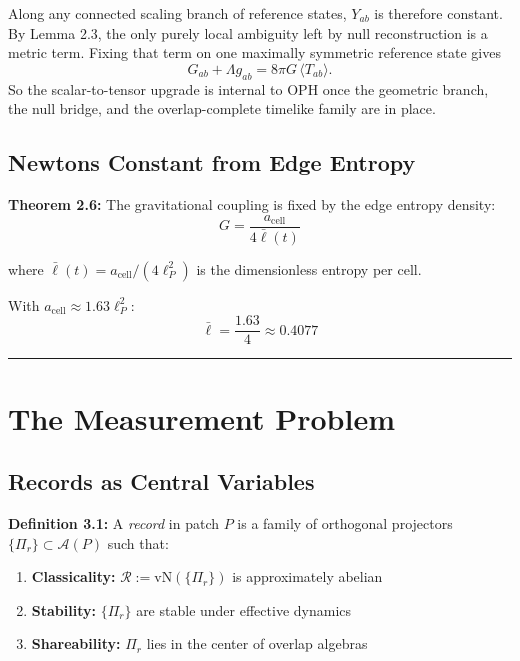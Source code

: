 Along any connected scaling branch of reference states, \(Y_{ab}\) is therefore constant. By Lemma 2.3, the only purely local ambiguity left by null reconstruction is a metric term. Fixing that term on one maximally symmetric reference state gives
\[
G_{ab}+\Lambda g_{ab}=8\pi G\,\langle T_{ab}\rangle.
\]
So the scalar-to-tensor upgrade is internal to OPH once the geometric branch, the null bridge, and the overlap-complete timelike family are in place.

\subsection{Newton\textquotesingle s Constant from Edge Entropy}\label{26-newtons-constant-from-edge-entropy}

\textbf{Theorem 2.6:} The gravitational coupling is fixed by the edge entropy density: \[G = \frac{a_{\text{cell}}}{4\bar{\ell}(t)}\]

where \(\bar{\ell}(t) = a_{\text{cell}}/(4\ell_P^2)\) is the dimensionless entropy per cell.

With \(a_{\text{cell}} \approx 1.63 \ell_P^2\): \[\bar{\ell} = \frac{1.63}{4} \approx 0.4077\]

\begin{center}\rule{0.5\linewidth}{0.5pt}\end{center}

\section{The Measurement Problem}\label{3-the-measurement-problem}

\subsection{Records as Central Variables}\label{31-records-as-central-variables}

\textbf{Definition 3.1:} A \emph{record} in patch \(P\) is a family of orthogonal projectors \(\{\Pi_r\} \subset \mathcal{A}(P)\) such that:

\begin{enumerate}
\def\labelenumi{\arabic{enumi}.}
\tightlist
\item
 \textbf{Classicality:} \(\mathcal{R} := \text{vN}(\{\Pi_r\})\) is approximately abelian
\item
 \textbf{Stability:} \(\{\Pi_r\}\) are stable under effective dynamics
\item
 \textbf{Shareability:} \(\Pi_r\) lies in the center of overlap algebras
\end{enumerate}

